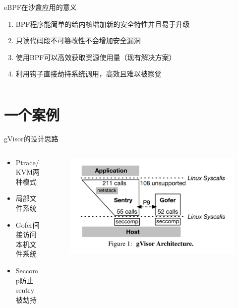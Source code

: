 \documentclass[UTF8,fontset=macnew,xcolor=table]{ctexbeamer}
\begin{document}
\begin{frame}
\begin{columns}
        \begin{column}{0.3\textwidth}
            {\footnotesize \begin{block}{eBPF在沙盒应用的意义}
                \begin{enumerate}
                    \item BPF程序能简单的给内核增加新的安全特性并且易于升级
                    \item 只读代码段不可篡改性不会增加安全漏洞
                    \item 使用BPF可以高效获取资源使用量（现有解决方案）
                    \item 利用钩子直接劫持系统调用，高效且难以被察觉
                \end{enumerate}
            \end{block}}
        \end{column}
    \end{columns}
\end{frame}

\section{一个案例}

\begin{frame}{gVisor的设计思路}
    \begin{columns}
        \begin{column}{0.5\textwidth}
            \begin{itemize}
                \item Ptrace/KVM两种模式
                \item 局部文件系统
                \item Gofer间接访问本机文件系统
                \item Seccomp防止sentry被劫持
            \end{itemize}
        \end{column}

        \begin{column}{0.5\textwidth}
            \begin{figure}[H]
                \centering
                \includegraphics[width=\columnwidth]{pic1.png}
            \end{figure}
        \end{column}
    \end{columns}
\end{frame}
\end{document}

